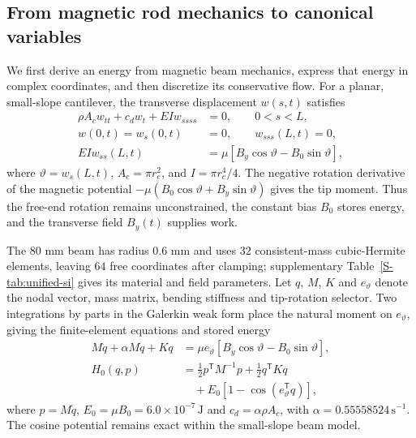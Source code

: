 \subsection{From magnetic rod mechanics to canonical variables}
\label{sec:core-canonical-model}
We first derive an energy from magnetic beam mechanics, express that
energy in complex coordinates, and then discretize its conservative
flow. For a planar, small-slope cantilever, the transverse displacement
$w(s,t)$ satisfies
\begin{align}
 \rho A_c w_{tt}+c_d w_t+EIw_{ssss}&=0,\qquad 0<s<L,\nonumber\\
 w(0,t)=w_s(0,t)&=0,\qquad w_{sss}(L,t)=0,\nonumber\\
 EIw_{ss}(L,t)&=\mu[B_y\cos\vartheta-B_0\sin\vartheta],
 \label{eq:core-beam-balance}
\end{align}
where $\vartheta=w_s(L,t)$, $A_c=\pi r_c^2$, and $I=\pi r_c^4/4$.
The negative rotation derivative of the magnetic potential
$-\mu(B_0\cos\vartheta+B_y\sin\vartheta)$ gives the tip moment.
Thus the free-end rotation remains unconstrained, the constant bias
$B_0$ stores energy, and the transverse field $B_y(t)$ supplies work.

The $80$ mm beam has radius $0.6$ mm and uses $32$ consistent-mass
cubic-Hermite elements, leaving $64$ free coordinates after clamping;
supplementary Table~\ref{S-tab:unified-si} gives its material and field
parameters. Let $q$, $M$, $K$ and $e_\vartheta$ denote the nodal vector,
mass matrix, bending stiffness and tip-rotation selector. Two integrations
by parts in the Galerkin weak form place the natural moment on
$e_\vartheta$, giving the finite-element equations and stored energy
\begin{align}
 M\ddot q+\alpha M\dot q+Kq
 &=\mu e_\vartheta[B_y\cos\vartheta-B_0\sin\vartheta],\nonumber\\
 H_0(q,p)&=\tfrac12p^{\mathsf T}M^{-1}p+\tfrac12q^{\mathsf T}Kq\nonumber\\
 &\quad+E_0[1-\cos(e_\vartheta^{\mathsf T}q)],
 \label{eq:core-fe-energy}
\end{align}
where $p=M\dot q$, $E_0=\mu B_0=6.0\times10^{-7}\,\mathrm J$ and
$c_d=\alpha\rho A_c$, with $\alpha=0.55558524\,\mathrm{s^{-1}}$.
The cosine potential remains exact within the small-slope beam model.

